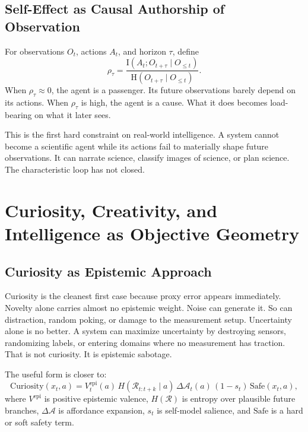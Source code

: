 \documentclass[11pt]{article}
\newcommand{\A}{\mathcal{A}}
\newcommand{\R}{\mathcal{R}}
\newcommand{\MI}{\mathrm{I}}
\newcommand{\Ent}{\mathrm{H}}
\newcommand{\Safe}{\mathrm{Safe}}
\begin{document}
\subsection{Self-Effect as Causal Authorship of Observation}

For observations $O_t$, actions $A_t$, and horizon $\tau$, define
\begin{equation}
  \rho_\tau = \frac{\MI(A_t;O_{t+\tau}\mid O_{\le t})}{\Ent(O_{t+\tau}\mid O_{\le t})}.
\end{equation}
When $\rho_\tau \approx 0$, the agent is a passenger. Its future observations barely depend on its actions. When $\rho_\tau$ is high, the agent is a cause. What it does becomes load-bearing on what it later sees.

This is the first hard constraint on real-world intelligence. A system cannot become a scientific agent while its actions fail to materially shape future observations. It can narrate science, classify images of science, or plan science. The characteristic loop has not closed.

\section{Curiosity, Creativity, and Intelligence as Objective Geometry}

\subsection{Curiosity as Epistemic Approach}

Curiosity is the cleanest first case because proxy error appears immediately. Novelty alone carries almost no epistemic weight. Noise can generate it. So can distraction, random poking, or damage to the measurement setup. Uncertainty alone is no better. A system can maximize uncertainty by destroying sensors, randomizing labels, or entering domains where no measurement has traction. That is not curiosity. It is epistemic sabotage.

The useful form is closer to:
\begin{equation}
  \mathrm{Curiosity}(x_t,a) = V^{\mathrm{epi}}_t(a)\, H(\R_{t:t+k}\mid a)\, \Delta \A_t(a)\, (1-s_t)\,\Safe(x_t,a),
\end{equation}
where $V^{\mathrm{epi}}$ is positive epistemic valence, $H(\R)$ is entropy over plausible future branches, $\Delta\A$ is affordance expansion, $s_t$ is self-model salience, and $\Safe$ is a hard or soft safety term.
\end{document}
